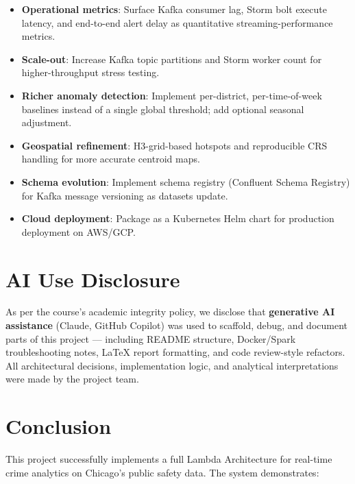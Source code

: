 \documentclass[12pt,a4paper]{article}
\begin{document}
\begin{itemize}[leftmargin=1.6em]
  \item \textbf{Operational metrics}: Surface Kafka consumer lag, Storm bolt execute latency, and end-to-end alert delay as quantitative streaming-performance metrics.
  \item \textbf{Scale-out}: Increase Kafka topic partitions and Storm worker count for higher-throughput stress testing.
  \item \textbf{Richer anomaly detection}: Implement per-district, per-time-of-week baselines instead of a single global threshold; add optional seasonal adjustment.
  \item \textbf{Geospatial refinement}: H3-grid-based hotspots and reproducible CRS handling for more accurate centroid maps.
  \item \textbf{Schema evolution}: Implement schema registry (Confluent Schema Registry) for Kafka message versioning as datasets update.
  \item \textbf{Cloud deployment}: Package as a Kubernetes Helm chart for production deployment on AWS/GCP.
\end{itemize}

\section{AI Use Disclosure}

As per the course's academic integrity policy, we disclose that \textbf{generative AI assistance} (Claude, GitHub Copilot) was used to scaffold, debug, and document parts of this project — including README structure, Docker/Spark troubleshooting notes, LaTeX report formatting, and code review-style refactors. All architectural decisions, implementation logic, and analytical interpretations were made by the project team.

\section{Conclusion}

This project successfully implements a full Lambda Architecture for real-time crime analytics on Chicago's public safety data. The system demonstrates:
\end{document}
